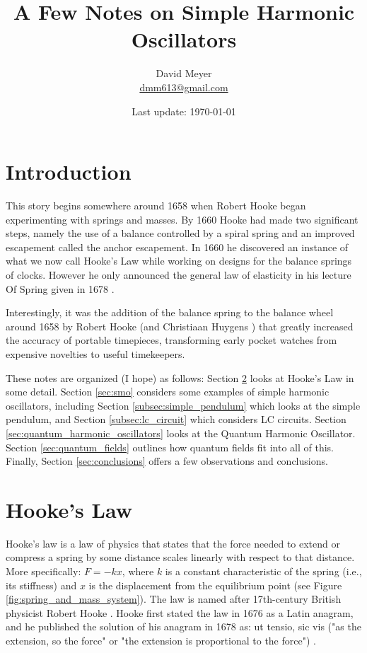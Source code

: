 \documentclass{article}
\title{A Few Notes on Simple Harmonic Oscillators}
\author{David Meyer \\ \href{mailto:dmm613@gmail.com}
                            {dmm613@gmail.com}}
\date{Last update: \today}
\theoremstyle{definition}
\begin{document}
\maketitle
%
%
%
\section{Introduction}
This story begins somewhere around 1658 when Robert Hooke
\cite{robert_hooke} began experimenting with springs and
masses. By 1660 Hooke had made two significant steps, namely the
use of a balance controlled by a spiral spring and an improved
escapement called the anchor escapement. In 1660 he discovered an
instance of what we now call Hooke's Law while working on designs
for the balance springs of clocks. However he only announced the
general law of elasticity in his lecture Of Spring given in 1678
\cite{hooke_of_spring}.

\bigskip
\noindent
Interestingly, it was the addition of the balance spring to the
balance wheel around 1658 by Robert Hooke (and Christiaan Huygens
\cite{wiki:huygens}) that greatly increased the accuracy of
portable timepieces, transforming early pocket watches from
expensive novelties to useful timekeepers.


\bigskip
\noindent
These notes are organized (I hope) as follows: Section
\ref{sec:hookes_law} looks at Hooke's Law in some detail.
Section \ref{sec:smo} considers some examples of simple harmonic
oscillators, including Section \ref{subsec:simple_pendulum} which
looks at the simple pendulum, and Section \ref{subsec:lc_circuit}
which considers LC circuits. Section
\ref{sec:quantum_harmonic_oscillators} looks at the Quantum
Harmonic Oscillator. Section \ref{sec:quantum_fields} outlines
how quantum fields fit into all of this. Finally, Section
\ref{sec:conclusions} offers a few observations and conclusions.


\section{Hooke's Law}
\label{sec:hookes_law}
Hooke's law \cite{wiki:hookes_law} is a law of physics that
states that the force needed to extend or compress a spring by
some distance scales linearly with respect to that distance. More
specifically: $F = -kx$, where $k$ is a constant characteristic
of the spring (i.e., its stiffness) and $x$ is the displacement
from the equilibrium point (see Figure
\ref{fig:spring_and_mass_system}).  The law is named after
17th-century British physicist Robert Hooke
\cite{robert_hooke}. Hooke first stated the law in 1676 as a
Latin anagram, and he published the solution of his anagram in
1678 as: ut tensio, sic vis ("as the extension, so the force" or
"the extension is proportional to the force")
\cite{hooke_of_spring}.
\end{document}
